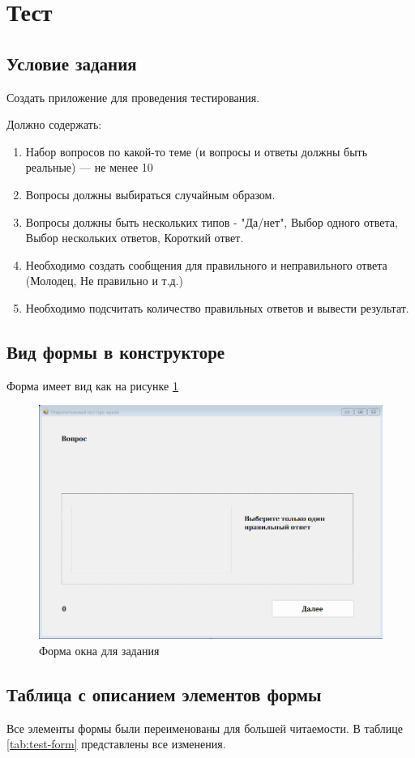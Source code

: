 \section{Тест}
\subsection{Условие задания}
Создать приложение для проведения тестирования.

Должно содержать:

\begin{enumerate}
\item Набор вопросов по какой-то теме (и вопросы и ответы должны быть реальные) --- не менее 10
\item Вопросы должны выбираться случайным образом.
\item Вопросы должны быть нескольких типов - "Да/нет", Выбор одного ответа, Выбор нескольких ответов, Короткий ответ.
\item Необходимо создать сообщения для правильного и неправильного ответа (Молодец, Не правильно и т.д.)
\item Необходимо подсчитать количество правильных ответов и вывести результат.
\end{enumerate}

\subsection{Вид формы в конструкторе}
Форма имеет вид как на рисунке \ref{fig:test-form}

\begin{figure}
\centering
\includegraphics[width=0.5\linewidth]{images/test/form.png}
\caption{Форма окна для задания}
\label{fig:test-form}
\end{figure}

\subsection{Таблица с описанием элементов формы}
Все элементы формы были переименованы для большей читаемости. В таблице \ref{tab:test-form} представлены все изменения.


